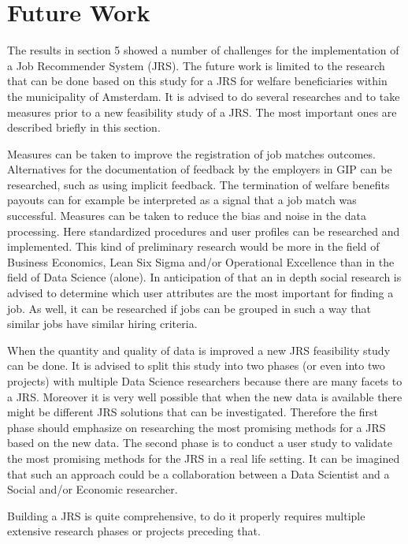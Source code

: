 \section{Future Work}
\label{sec:fut}

The results in section 5 showed a number of challenges for the implementation of a Job Recommender System (JRS).
The future work is limited to the research that can be done based on this study for a JRS for welfare beneficiaries within the municipality of Amsterdam.
It is advised to do several researches and to take measures prior to a new feasibility study of a JRS.
The most important ones are described briefly in this section.

Measures can be taken to improve the registration of job matches outcomes.
Alternatives for the documentation of feedback by the employers in GIP can be researched, such as using implicit feedback.
The termination of welfare benefits payouts can for example be interpreted as a signal that a job match was successful. 
Measures can be taken to reduce the bias and noise in the data processing.
Here standardized procedures and user profiles can be researched and implemented.
This kind of preliminary research would be more in the field of Business Economics, Lean Six Sigma and/or Operational Excellence than in the field of Data Science (alone).
In anticipation of that an in depth social research is advised to determine which user attributes are the most important for finding a job.
As well, it can be researched if jobs can be grouped in such a way that similar jobs have similar hiring criteria.

When the quantity and quality of data is improved a new JRS feasibility study can be done.
It is advised to split this study into two phases (or even into two  projects) with multiple Data Science researchers because there are many facets to a JRS. 
Moreover it is very well possible that when the new data is available there might be different JRS solutions that can be investigated.
Therefore the first phase should emphasize on researching the most promising methods for a JRS based on the new data.
The second phase is to conduct a user study to validate the most promising methods for the JRS in a real life setting.
It can be imagined that such an approach could be a collaboration between a Data Scientist and a Social and/or Economic researcher.  

Building a JRS is quite comprehensive, to do it properly requires multiple extensive research phases or projects preceding that.
